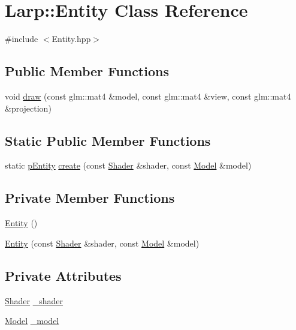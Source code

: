 \hypertarget{classLarp_1_1Entity}{}\section{Larp\+:\+:Entity Class Reference}
\label{classLarp_1_1Entity}


{\ttfamily \#include $<$Entity.\+hpp$>$}

\subsection*{Public Member Functions}
\begin{DoxyCompactItemize}
\item 
void \hyperlink{classLarp_1_1Entity_a2531d3e43c8c6046d5879881392365ad}{draw} (const glm\+::mat4 \&model, const glm\+::mat4 \&view, const glm\+::mat4 \&projection)
\end{DoxyCompactItemize}
\subsection*{Static Public Member Functions}
\begin{DoxyCompactItemize}
\item 
static \hyperlink{namespaceLarp_aca47662468377e5aaf9a665699a4d97f}{p\+Entity} \hyperlink{classLarp_1_1Entity_a1205325da617b6ff1882231cbe812471}{create} (const \hyperlink{classLarp_1_1Shader}{Shader} \&shader, const \hyperlink{classLarp_1_1Model}{Model} \&model)
\end{DoxyCompactItemize}
\subsection*{Private Member Functions}
\begin{DoxyCompactItemize}
\item 
\hyperlink{classLarp_1_1Entity_ad4b4badc7c5cb0fc6b3f2dc3525060e8}{Entity} ()
\item 
\hyperlink{classLarp_1_1Entity_ad5f6b1da9de62146b4c1c5a4cd4f2bc8}{Entity} (const \hyperlink{classLarp_1_1Shader}{Shader} \&shader, const \hyperlink{classLarp_1_1Model}{Model} \&model)
\end{DoxyCompactItemize}
\subsection*{Private Attributes}
\begin{DoxyCompactItemize}
\item 
\hyperlink{classLarp_1_1Shader}{Shader} \hyperlink{classLarp_1_1Entity_a237a03d104060dcf5db941d8b4bd5a5a}{\+\_\+shader}
\item 
\hyperlink{classLarp_1_1Model}{Model} \hyperlink{classLarp_1_1Entity_afdfe4aa2819f1ba5d0623cd034bec14e}{\+\_\+model}
\end{DoxyCompactItemize}


